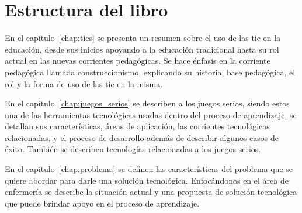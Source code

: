 \section{Estructura del libro}
    



En el capítulo~\ref{chap:tics} se presenta un resumen sobre el uso de las
\Gls{tic} en la educación, desde sus inicios apoyando a la educación
tradicional hasta su rol actual en las nuevas corrientes pedagógicas. Se
hace énfasis en la corriente pedagógica llamada construccionismo, explicando
su historia, base pedagógica, el rol y la forma de uso de las \Gls{tic} en
la misma.


En el capítulo~\ref{chap:juegos_serios} se describen a los juegos serios, siendo 
estos una de las herramientas tecnológicas usadas dentro del proceso de aprendizaje, 
se detallan sus características, áreas de aplicación, las corrientes tecnológicas relacionadas, 
y el proceso de desarrollo además de describir algunos casos de éxito. También se describen 
tecnologías relacionadas a los juegos serios.



En el capítulo~\ref{chap:problema} se definen las características del problema
que se quiere abordar para darle una solución tecnológica. Enfocándonos en el
área de enfermería se describe la situación actual y una propuesta de solución tecnológica 
que puede brindar apoyo en el proceso de aprendizaje.




